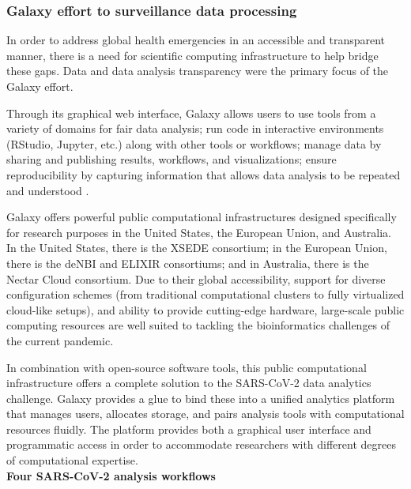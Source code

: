         \subsubsection{Galaxy effort to surveillance data processing} \label{sec:intro:galaxy-effort}
        
        In order to address global health emergencies in an accessible and transparent manner, there is a need for scientific computing infrastructure to help bridge these gaps. Data and data analysis transparency were the primary focus of the Galaxy effort.

        Through its graphical web interface, Galaxy allows users to use tools from a variety of domains for \acrshort{fair} \cite{wilkinson2016} data analysis; run code in interactive environments (RStudio, Jupyter, etc.) along with other tools or workflows; manage data by sharing and publishing results, workflows, and visualizations; ensure reproducibility by capturing information that allows data analysis to be repeated and understood \cite{baker2020}.
        
        Galaxy offers powerful public computational infrastructures designed specifically for research purposes in the United States, the European Union, and Australia. In the United States, there is the XSEDE \cite{towns2014} consortium; in the European Union, there is the deNBI \cite{elixirde} and ELIXIR \cite{elixir2,elixir} consortiums; and in Australia, there is the Nectar Cloud consortium. Due to their global accessibility, support for diverse configuration schemes (from traditional computational clusters to fully virtualized cloud-like setups), and ability to provide cutting-edge hardware, large-scale public computing resources are well suited to tackling the bioinformatics challenges of the current pandemic. 
        
        In combination with open-source software tools, this public computational infrastructure offers a complete solution to the SARS-CoV-2 data analytics challenge. Galaxy provides a glue to bind these into a unified analytics platform that manages users, allocates storage, and pairs analysis tools with computational resources fluidly. The platform provides both a graphical user interface and programmatic access in order to accommodate researchers with different degrees of computational expertise. \\

        \textbf{Four SARS-CoV-2 analysis workflows} \\
        
